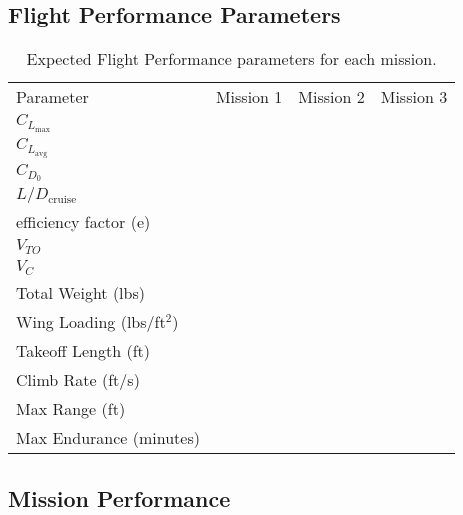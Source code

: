 \subsection{Flight Performance Parameters}
\label{ssec:flightperformanceparams}

\begin{table}[h!]
	\centering
	\caption{Expected Flight Performance parameters for each mission.}
	\label{tab:expectedflightperformance}
	\begin{tabular}{ C{1.5in}  C{1in}  C{1in}  C{1in}}
		
		Parameter & Mission 1 & Mission 2 & Mission 3 \\
		
		\(C_{L_\text{max}}\) & & &\\
		
		\(C_{L_\text{avg}}\) & & &\\
		
		\(C_{D_0}\) & & &\\
		
		\(L/D_\text{cruise}\) & & &\\
		
		efficiency factor (e) & & & \\
		
		\(V_{TO}\) & & & \\
		
		\(V_C\) & & & \\
		
		Total Weight (lbs) & & &\\
		
		Wing Loading (lbs/ft\(^2\)) & & &\\
		
		Takeoff Length (ft) & & & \\
		
		Climb Rate (ft/s) & & &  \\
		
		Max Range (ft) & & & \\
		
		Max Endurance (minutes) & & & \\
		
	\end{tabular}
\end{table}


\subsection{Mission Performance}
\label{ssec:missionperformance}

